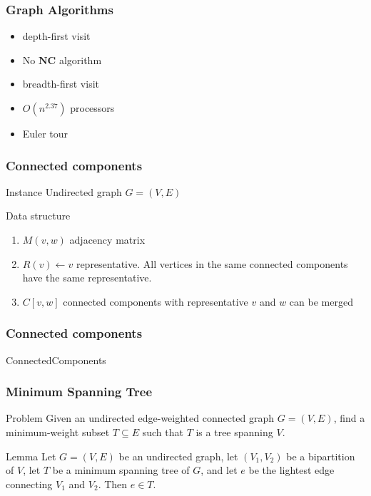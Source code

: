 \documentclass[14pt]{beamer}
\begin{document}
\begin{frame}\frametitle{Graph Algorithms}
  \begin{itemize}
  \item
    depth-first visit
  \item
    No $\mathbf{NC}$ algorithm
  \item
    breadth-first visit
  \item
    $O(n^{2.37})$ processors
  \item
    \alert{Euler tour}
  \end{itemize}
\end{frame}


\begin{frame}\frametitle{Connected components}
\begin{block}{Instance}
Undirected graph $G=(V,E)$
\end{block}
\begin{block}{Data structure}
\begin{enumerate} 
\item
$M(v,w)$ adjacency matrix
\item
$R(v) \gets v$ representative.    
All vertices in the same connected components have the same representative.    
\item
$C[v,w]$ connected components with representative $v$ and $w$ can be merged
\end{enumerate}
\end{block}
\end{frame}

\begin{frame}\frametitle{Connected components}
  \begin{algorithm}[H]
    \caption{ConnectedComponents}
  \end{algorithm}
\end{frame}


\begin{frame}\frametitle{Minimum Spanning Tree}
\begin{block}{Problem}
Given an undirected edge-weighted connected graph $G=(V,E)$, find a
minimum-weight subset
$T\subseteq E$ such that $T$ is a tree spanning $V$.    
\end{block}

\begin{block}{Lemma}
Let $G=(V,E)$ be an undirected graph, let $(V_{1}, V_{2})$ be a
bipartition of $V$, let $T$ be a minimum spanning tree of $G$, and let
$e$ be the lightest edge connecting $V_{1}$ and $V_{2}$.    
Then $e\in T$.    
\end{block}
\end{frame}
\end{document}

